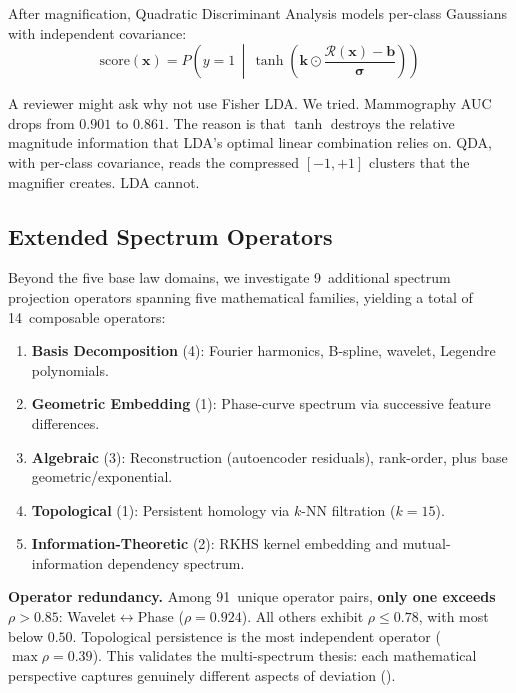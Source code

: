 \documentclass{article}
\newcommand{\calR}{\mathcal{R}}
\begin{document}
After magnification, Quadratic Discriminant Analysis models per-class Gaussians with independent covariance:
\begin{equation}
\text{score}(\mathbf{x}) = P\!\left(y{=}1 \,\middle|\, \tanh\!\left(\mathbf{k} \odot \frac{\calR(\mathbf{x}) - \mathbf{b}}{\bm{\sigma}}\right)\right)
\label{eq:qda_magnified}
\end{equation}

A reviewer might ask why not use Fisher LDA. We tried. Mammography AUC drops from $0.901$ to $0.861$. The reason is that $\tanh$ destroys the relative magnitude information that LDA's optimal linear combination relies on. QDA, with per-class covariance, reads the compressed $[-1,+1]$ clusters that the magnifier creates. LDA cannot.

\subsection{Extended Spectrum Operators}
\label{ssec:extended}

Beyond the five base law domains, we investigate 9~additional spectrum projection operators spanning five mathematical families, yielding a total of 14~composable operators:

\begin{enumerate}[leftmargin=*]
  \item \textbf{Basis Decomposition} (4): Fourier harmonics, B-spline, wavelet, Legendre polynomials.
  \item \textbf{Geometric Embedding} (1): Phase-curve spectrum via successive feature differences.
  \item \textbf{Algebraic} (3): Reconstruction (autoencoder residuals), rank-order, plus base geometric/exponential.
  \item \textbf{Topological} (1): Persistent homology via $k$-NN filtration ($k{=}15$).
  \item \textbf{Information-Theoretic} (2): RKHS kernel embedding and mutual-information dependency spectrum.
\end{enumerate}

\textbf{Operator redundancy.} Among 91~unique operator pairs, \textbf{only one exceeds $\rho > 0.85$}: Wavelet$\leftrightarrow$Phase ($\rho = 0.924$). All others exhibit $\rho \leq 0.78$, with most below $0.50$. Topological persistence is the most independent operator ($\max \rho{=}0.39$). This validates the multi-spectrum thesis: each mathematical perspective captures genuinely different aspects of deviation ().
\end{document}
